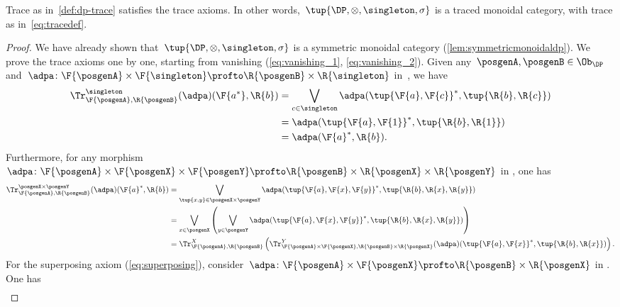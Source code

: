 \begin{lemma}
    Trace as in~\cref{def:dp-trace} satisfies the trace axioms. In other words,~$\tup{\DP, \otimes, \singleton, \sigma}$ is a traced monoidal category, with trace as in~\cref{eq:tracedef}.
\end{lemma}
\begin{proof}
    We have already shown that~$\tup{\DP,\otimes,\singleton,\sigma}$ is a symmetric monoidal category (\cref{lem:symmetricmonoidaldp}).
    We prove the trace axioms one by one, starting from vanishing (\cref{eq:vanishing_1}, \cref{eq:vanishing_2}).
    Given any~$\posgenA,\posgenB\in \Ob_\DP$ and~$\adpa\colon \F{\posgenA}\times \F{\singleton}\profto \R{\posgenB}\times \R{\singleton}$ in~\DP, we have
    \begin{equation}
        \begin{aligned}
            \Tr_{\F{\posgenA},\R{\posgenB}}^{\singleton}(\adpa)(\F{a^*},\R{b})&=\bigvee_{c\in \singleton}\adpa(\tup{\F{a},\F{c}}^*,\tup{\R{b},\R{c}})\\
            &=\adpa(\tup{\F{a},\F{1}}^*,\tup{\R{b},\R{1}})\\
            &=\adpa(\F{a}^*,\R{b}).
        \end{aligned}
    \end{equation}
    Furthermore, for any morphism~$\adpa\colon \F{\posgenA}\times \F{\posgenX}\times \F{\posgenY} \profto \R{\posgenB}\times \R{\posgenX} \times \R{\posgenY}$ in \DP, one has
    \begin{equation}
        \begin{aligned}
            \Tr_{\F{\posgenA},\R{\posgenB}}^{\posgenX\times \posgenY}(\adpa)(\F{a}^*,\R{b})&=\bigvee_{\tup{x,y} \in \posgenX\times \posgenY} \adpa(\tup{\F{a},\F{x},\F{y}}^*,\tup{\R{b},\R{x},\R{y}})\\
            &=\bigvee_{x \in \posgenX}\left(\bigvee_{y \in \posgenY} \adpa(\tup{\F{a},\F{x},\F{y}}^*,\tup{\R{b},\R{x},\R{y}})\right)\\
            &=\Tr_{\F{\posgenA},\R{\posgenB}}^X\left(
            \Tr_{\F{\posgenA}\times \F{\posgenX},\R{\posgenB}\times \R{\posgenX}}^Y(\adpa)(\tup{\F{a},\F{x}}^*,\tup{\R{b},\R{x}})\right).
        \end{aligned}
    \end{equation}
    For the superposing axiom (\cref{eq:superposing}), consider~$\adpa\colon \F{\posgenA}\times \F{\posgenX}\profto \R{\posgenB}\times \R{\posgenX}$ in \DP.
    One has
    \begin{equation}
        \begin{aligned}

\end{aligned}
\end{equation}
\end{proof}
